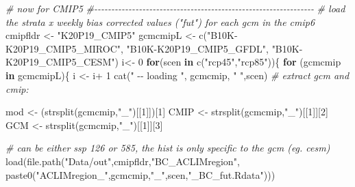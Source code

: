\documentclass[
]{article}
\newenvironment{Shaded}{\begin{snugshade}}{\end{snugshade}}
\newcommand{\CommentTok}[1]{\textcolor[rgb]{0.56,0.35,0.01}{\textit{#1}}}
\newcommand{\ControlFlowTok}[1]{\textcolor[rgb]{0.13,0.29,0.53}{\textbf{#1}}}
\newcommand{\DecValTok}[1]{\textcolor[rgb]{0.00,0.00,0.81}{#1}}
\newcommand{\FunctionTok}[1]{\textcolor[rgb]{0.00,0.00,0.00}{#1}}
\newcommand{\NormalTok}[1]{#1}
\newcommand{\OtherTok}[1]{\textcolor[rgb]{0.56,0.35,0.01}{#1}}
\newcommand{\SpecialCharTok}[1]{\textcolor[rgb]{0.00,0.00,0.00}{#1}}
\newcommand{\StringTok}[1]{\textcolor[rgb]{0.31,0.60,0.02}{#1}}
\begin{document}
\begin{Shaded}
\begin{Highlighting}[]
   \CommentTok{\# now for CMIP5}
   \CommentTok{\#{-}{-}{-}{-}{-}{-}{-}{-}{-}{-}{-}{-}{-}{-}{-}{-}{-}{-}{-}{-}{-}{-}{-}{-}{-}{-}{-}{-}{-}{-}{-}{-}{-}{-}{-}{-}{-}{-}{-}{-}{-}{-}{-}{-}{-}{-}{-}{-}{-}{-}{-}{-}{-}{-}{-}{-}{-}{-}{-}{-}{-}{-}{-}{-}}
   \CommentTok{\# load the strata x weekly bias corrected values ("fut") for each gcm in the cmip6}
\NormalTok{  cmipfldr }\OtherTok{\textless{}{-}} \StringTok{"K20P19\_CMIP5"}
\NormalTok{  gcmcmipL }\OtherTok{\textless{}{-}} \FunctionTok{c}\NormalTok{(}\StringTok{"B10K{-}K20P19\_CMIP5\_MIROC"}\NormalTok{,}
                     \StringTok{"B10K{-}K20P19\_CMIP5\_GFDL"}\NormalTok{,}
                     \StringTok{"B10K{-}K20P19\_CMIP5\_CESM"}\NormalTok{)}
\NormalTok{i}\OtherTok{\textless{}{-}} \DecValTok{0}
\ControlFlowTok{for}\NormalTok{(scen }\ControlFlowTok{in} \FunctionTok{c}\NormalTok{(}\StringTok{"rcp45"}\NormalTok{,}\StringTok{"rcp85"}\NormalTok{))\{}
  \ControlFlowTok{for}\NormalTok{ (gcmcmip }\ControlFlowTok{in}\NormalTok{ gcmcmipL)\{}
\NormalTok{  i }\OtherTok{\textless{}{-}}\NormalTok{ i}\SpecialCharTok{+} \DecValTok{1}
  \FunctionTok{cat}\NormalTok{(}\StringTok{" {-}{-} loading "}\NormalTok{, gcmcmip, }\StringTok{" "}\NormalTok{,scen)}
  \CommentTok{\# extract gcm and cmip:}
  
\NormalTok{  mod   }\OtherTok{\textless{}{-}}\NormalTok{ (}\FunctionTok{strsplit}\NormalTok{(gcmcmip,}\StringTok{"\_"}\NormalTok{)[[}\DecValTok{1}\NormalTok{]])[}\DecValTok{1}\NormalTok{]}
\NormalTok{  CMIP  }\OtherTok{\textless{}{-}} \FunctionTok{strsplit}\NormalTok{(gcmcmip,}\StringTok{"\_"}\NormalTok{)[[}\DecValTok{1}\NormalTok{]][}\DecValTok{2}\NormalTok{]}
\NormalTok{  GCM   }\OtherTok{\textless{}{-}} \FunctionTok{strsplit}\NormalTok{(gcmcmip,}\StringTok{"\_"}\NormalTok{)[[}\DecValTok{1}\NormalTok{]][}\DecValTok{3}\NormalTok{]}
      
  \CommentTok{\# can be either ssp 126 or 585, the hist is only specific to the gcm (eg. cesm)}
  \FunctionTok{load}\NormalTok{(}\FunctionTok{file.path}\NormalTok{(}\StringTok{"Data/out"}\NormalTok{,cmipfldr,}\StringTok{"BC\_ACLIMregion"}\NormalTok{, }\FunctionTok{paste0}\NormalTok{(}\StringTok{"ACLIMregion\_"}\NormalTok{,gcmcmip,}\StringTok{"\_"}\NormalTok{,scen,}\StringTok{"\_BC\_fut.Rdata"}\NormalTok{)))}
 

\end{Highlighting}
\end{Shaded}
\end{document}
